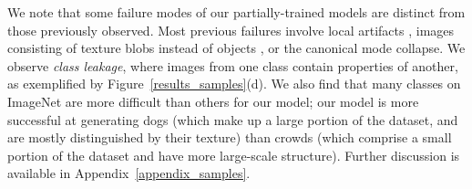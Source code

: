 \documentclass{article} %
\begin{document}
We note that some failure modes of our partially-trained models are distinct from those previously observed. Most previous failures involve local artifacts \citep{odena2016deconvolution}, images consisting of texture blobs instead of  objects \citep{salimans2016improved}, or the canonical mode collapse. We observe \textit{class leakage}, where images from one class contain properties of another, as exemplified by Figure~\ref{results_samples}(d).  We also find that many classes on ImageNet are more difficult than others for our model; our model is more successful at generating dogs (which make up a large portion of the dataset, and are mostly distinguished by their texture) than crowds  (which comprise a small portion of the dataset and have more large-scale structure). Further discussion is available in Appendix~\ref{appendix_samples}.
\end{document}
